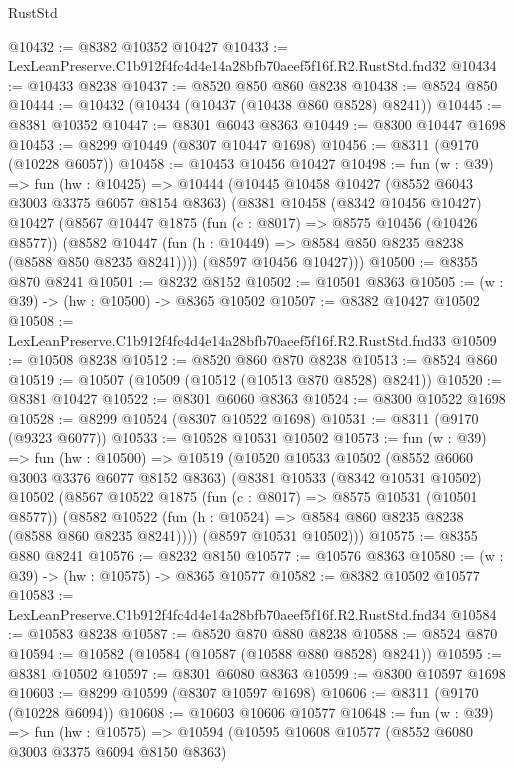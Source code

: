 \begin{lexlean}{RustStd}
\begin{coremodule}
@10432 := @8382 @10352 @10427
@10433 := LexLeanPreserve.C1b912f4fc4d4e14a28bfb70aeef5f16f.R2.RustStd.fnd32
@10434 := @10433 @8238
@10437 := @8520 @850 @860 @8238
@10438 := @8524 @850
@10444 := @10432 (@10434 (@10437 (@10438 @860 @8528) @8241))
@10445 := @8381 @10352
@10447 := @8301 @6043 @8363
@10449 := @8300 @10447 @1698
@10453 := @8299 @10449 (@8307 @10447 @1698)
@10456 := @8311 (@9170 (@10228 @6057))
@10458 := @10453 @10456 @10427
@10498 := fun (w : @39) =>
  fun (hw : @10425) =>
  @10444
    (@10445
      @10458
      @10427
      (@8552 @6043 @3003 @3375 @6057 @8154 @8363)
      (@8381
        @10458
        (@8342 @10456 @10427)
        @10427
        (@8567
          @10447
          @1875
          (fun (c : @8017) => @8575 @10456 (@10426 @8577))
          (@8582 @10447 (fun (h : @10449) => @8584 @850 @8235 @8238 (@8588 @850 @8235 @8241))))
        (@8597 @10456 @10427)))
@10500 := @8355 @870 @8241
@10501 := @8232 @8152
@10502 := @10501 @8363
@10505 := (w : @39) -> (hw : @10500) -> @8365 @10502
@10507 := @8382 @10427 @10502
@10508 := LexLeanPreserve.C1b912f4fc4d4e14a28bfb70aeef5f16f.R2.RustStd.fnd33
@10509 := @10508 @8238
@10512 := @8520 @860 @870 @8238
@10513 := @8524 @860
@10519 := @10507 (@10509 (@10512 (@10513 @870 @8528) @8241))
@10520 := @8381 @10427
@10522 := @8301 @6060 @8363
@10524 := @8300 @10522 @1698
@10528 := @8299 @10524 (@8307 @10522 @1698)
@10531 := @8311 (@9170 (@9323 @6077))
@10533 := @10528 @10531 @10502
@10573 := fun (w : @39) =>
  fun (hw : @10500) =>
  @10519
    (@10520
      @10533
      @10502
      (@8552 @6060 @3003 @3376 @6077 @8152 @8363)
      (@8381
        @10533
        (@8342 @10531 @10502)
        @10502
        (@8567
          @10522
          @1875
          (fun (c : @8017) => @8575 @10531 (@10501 @8577))
          (@8582 @10522 (fun (h : @10524) => @8584 @860 @8235 @8238 (@8588 @860 @8235 @8241))))
        (@8597 @10531 @10502)))
@10575 := @8355 @880 @8241
@10576 := @8232 @8150
@10577 := @10576 @8363
@10580 := (w : @39) -> (hw : @10575) -> @8365 @10577
@10582 := @8382 @10502 @10577
@10583 := LexLeanPreserve.C1b912f4fc4d4e14a28bfb70aeef5f16f.R2.RustStd.fnd34
@10584 := @10583 @8238
@10587 := @8520 @870 @880 @8238
@10588 := @8524 @870
@10594 := @10582 (@10584 (@10587 (@10588 @880 @8528) @8241))
@10595 := @8381 @10502
@10597 := @8301 @6080 @8363
@10599 := @8300 @10597 @1698
@10603 := @8299 @10599 (@8307 @10597 @1698)
@10606 := @8311 (@9170 (@10228 @6094))
@10608 := @10603 @10606 @10577
@10648 := fun (w : @39) =>
  fun (hw : @10575) =>
  @10594
    (@10595
      @10608
      @10577
      (@8552 @6080 @3003 @3375 @6094 @8150 @8363)

\end{coremodule}
\end{lexlean}
